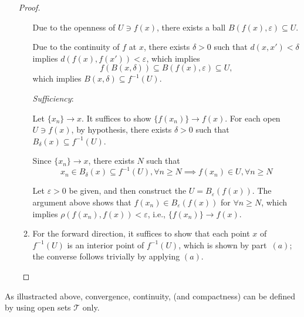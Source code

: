\begin{enumerate}
\begin{proof}
\begin{enumerate}
Due to the openness of $U\ni f(x)$, there exists a ball $B(f(x),\varepsilon)\subseteq U$.

Due to the continuity of $f$ at $x$, there exists $\delta>0$ such that $d(x,x')<\delta$ implies $d(f(x),f(x'))<\varepsilon$, which implies
\[
f(B(x,\delta))\subseteq B(f(x),\varepsilon)\subseteq U,
\]
which implies $B(x,\delta)\subseteq f^{-1}(U).$

\textit{Sufficiency}:

Let $\{x_n\}\to x$. It suffices to show $\{f(x_n)\}\to f(x)$. For each open $U\ni f(x)$, by hypothesis, there exists $\delta>0$ such that $B_\delta(x)\subseteq f^{-1}(U)$.

Since $\{x_n\}\to x$, there exists $N$ such that
\[
x_n\in B_\delta(x)\subseteq f^{-1}(U),\forall n\ge N\implies f(x_n)\in U, \forall n\ge N
\]

Let $\varepsilon>0$ be given, and then construct the $U=B_{\varepsilon}(f(x))$. The argument above shows that $f(x_n)\in B_{\varepsilon}(f(x))$ for $\forall n\ge N$, which implies $\rho(f(x_n),f(x))<\varepsilon$, i.e., $\{f(x_n)\}\to f(x)$.
\item
For the forward direction, it suffices to show that each point $x$ of $f^{-1}(U)$ is an interior point of $f^{-1}(U)$, which is shown by part~$(a)$; the converse follows trivially by applying $(a)$.
\end{enumerate}
\end{proof}
\end{enumerate}
\begin{remark}
As illustracted above, convergence, continuity, (and compactness) can be defined by using open sets $\mathcal{T}$ only.
\end{remark}


